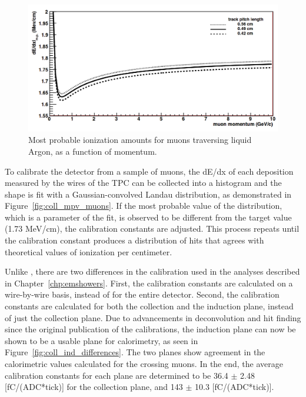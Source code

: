 \begin{figure}[tb]
  \centering
  \includegraphics[width=\textwidth]{lartpc_figures/mpv_muons.png}
  \caption[Most Probable Ionization, Muons]{Most probable ionization amounts for muons traversing liquid Argon, as a function of momentum.}
  \label{fig:mpv_muons}
\end{figure}

To calibrate the detector from a sample of muons, the dE/dx of each deposition measured by the wires of the TPC can be collected into a histogram and the shape is fit with a Gaussian-convolved Landau distribution, as demonstrated in Figure~\ref{fig:coll_mpv_muons}.  If the most probable value of the distribution, which is a parameter of the fit, is observed to be different from the target value (1.73 MeV/cm), the calibration constants are adjusted.  This process repeats until the calibration constant produces a distribution of hits that agrees with theoretical values of ionization per centimeter.

Unlike \cite{Anderson:2012mra}, there are two differences in the calibration used in the analyses described in Chapter~\ref{chp:emshowers}. First, the calibration constants are calculated on a wire-by-wire basis, instead of for the entire detector.  Second, the calibration constants are calculated for both the collection and the induction plane, instead of just the collection plane.  Due to advancements in deconvolution and hit finding since the original publication of the \argoneut calibrations, the induction plane can now be shown to be a usable plane for calorimetry, as seen in Figure~\ref{fig:coll_ind_differences}.  The two planes show agreement in the calorimetric values calculated for the crossing muons.  In the end, the average calibration constants for each plane are determined to be 36.4 $\pm$ 2.48 [fC/(ADC*tick)] for the collection plane, and 143 $\pm$ 10.3 [fC/(ADC*tick)].

